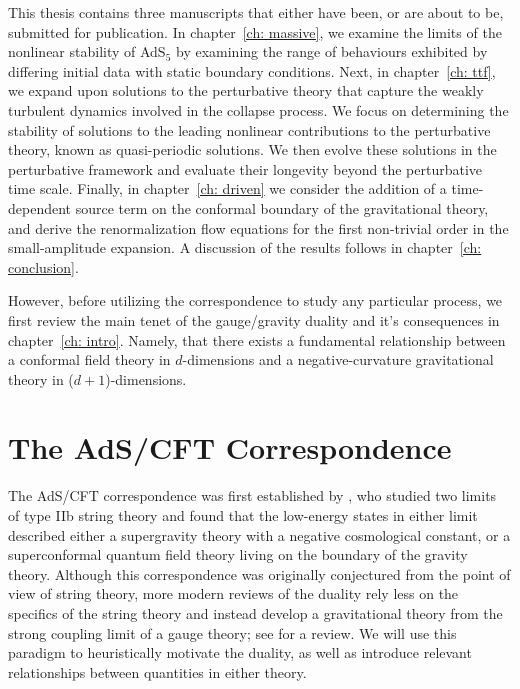 \documentclass[../PhD.tex]{subfiles}
\begin{document}
This thesis contains three manuscripts that either have been, or are about to be, submitted for publication. In chapter~\ref{ch: massive}, we examine the limits of the nonlinear stability of AdS$_5$ by examining the range of behaviours exhibited by differing initial data with static boundary conditions. Next, in chapter~\ref{ch: ttf}, we expand upon solutions to the perturbative theory that capture the weakly turbulent dynamics involved in the collapse process. We focus on determining the stability of solutions to the leading nonlinear contributions to the perturbative theory, known as quasi-periodic solutions. We then evolve these solutions in the perturbative framework and evaluate their longevity beyond the perturbative time scale. Finally, in chapter~\ref{ch: driven} we consider the addition of a time-dependent source term on the conformal boundary of the gravitational theory, and derive the renormalization flow equations for the first non-trivial order in the small-amplitude expansion. A discussion of the results follows in chapter~\ref{ch: conclusion}.

However, before utilizing the correspondence to study any particular process, we first review the main tenet of the gauge/gravity duality and it's consequences in chapter~\ref{ch: intro}. Namely, that there exists a fundamental relationship between a conformal field theory in $d$-dimensions and a negative-curvature gravitational theory in ($d + 1$)-dimensions.


\section{The AdS/CFT Correspondence}
\label{sec: ads/cft}

The AdS/CFT correspondence was first established by \cite{hep-th/9711200}, who studied two limits of type IIb string theory and found that the low-energy states in either limit described either a supergravity theory with a negative cosmological constant, or a superconformal quantum field theory living on the boundary of the gravity theory. Although this correspondence was originally conjectured from the point of view of string theory, more modern reviews of the duality rely less on the specifics of the string theory and instead develop a gravitational theory from the strong coupling limit of a gauge theory; see \cite{gr-qc/0602037} for a review. We will use this paradigm to heuristically motivate the duality, as well as introduce relevant relationships between quantities in either theory.  
\end{document}
